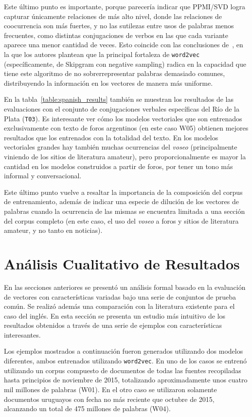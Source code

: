 Este último punto es importante, porque parecería indicar que PPMI/SVD logra capturar únicamente
relaciones de más alto nivel, donde las relaciones de coocurrencia son más fuertes, y no las
sutilezas entre usos de palabras menos frecuentes, como distintas conjugaciones de verbos en las que
cada variante aparece una menor cantidad de veces. Esto coincide con las conclusiones
de~\cite{Levy2014a}, en la que los autores plantean que la principal fortaleza de \texttt{word2vec}
(específicamente, de Skipgram con negative sampling) radica en la capacidad que tiene este algoritmo
de no sobrerrepresentar palabras demasiado comunes, distribuyendo la información en los vectores de
manera más uniforme.


En la tabla~\ref{table:spanish_results} también se muestran los resultados de las evaluaciones con
el conjunto de conjugaciones verbales específicas del Río de la Plata (\texttt{T03}). Es interesante
ver cómo los modelos vectoriales que son entrenados exclusivamente con texto de foros argentinos (en
este caso W05) obtienen mejores resultados que los entrenados con la totalidad del texto. En los
modelos vectoriales grandes hay también muchas ocurrencias del \textit{voseo} (principalmente
viniendo de los sitios de literatura amateur), pero proporcionalmente es mayor la cantidad en los
modelos construidos a partir de foros, por tener un tono más informal y conversacional.

Este último punto vuelve a resaltar la importancia de la composición del corpus de entrenamiento,
además de indicar una especie de dilución de los vectores de palabras cuando la ocurrencia de las
mismas se encuentra limitada a una sección del corpus completo (en este caso, el uso del
\textit{voseo} a foros y sitios de literatura amateur, y no tanto en noticias).


\section{Análisis Cualitativo de Resultados}

En las secciones anteriores se presentó un análisis formal basado en la evaluación de vectores con
características variadas bajo una serie de conjuntos de prueba común. Se realizó además
una comparación con la literatura existente para el caso del inglés. En esta sección se presenta
un estudio más intuitivo de los resultados obtenidos a través de una serie de ejemplos con
características interesantes.

Los ejemplos mostrados a continuación fueron generados utilizando dos modelos diferentes, ambos
entrenados utilizando \texttt{word2vec}. En uno de los casos se entrenó utilizando un corpus
compuesto de documentos de todas las fuentes recopiladas hasta principios de noviembre de 2015,
totalizando aproximadamente unos cuatro mil millones de palabras (W01). En el otro caso se
utilizaron solamente documentos uruguayos con fecha no más reciente que octubre de 2015, alcanzando
un total de 475 millones de palabras (W04).

